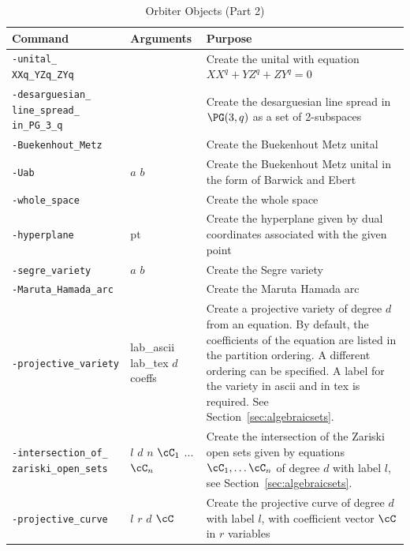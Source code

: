 \begin{table}
\begin{center}
\begin{tabular}{|p{4cm}|l|p{8cm}|}
\hline
Command  & Arguments & Purpose \\
\hline
\hline
\verb'-unital_' \verb'XXq_YZq_ZYq' &  &  Create  the unital with equation $XX^q+YZ^q+ZY^q=0$ \\
\hline
\verb'-desarguesian_' \verb'line_spread_' \verb'in_PG_3_q' &  & Create the desarguesian line spread in $\PG(3,q)$ as a set of 2-subspaces \\
\hline
\verb'-Buekenhout_Metz' &  & Create the Buekenhout Metz unital \\
\hline
\verb'-Uab' & $a$ $b$ & Create the Buekenhout Metz unital in the form of Barwick and Ebert~\cite{BarwickEbert2008}\\
\hline
\verb'-whole_space' &  & Create the whole space\\
\hline
\verb'-hyperplane' & pt & Create the hyperplane given by dual coordinates associated with the given point\\
\hline
\verb'-segre_variety' & $a$ $b$ & Create the Segre variety\\
\hline
\verb'-Maruta_Hamada_arc' &  & Create the Maruta Hamada arc\\
\hline
		\verb'-projective_variety' & lab\_ascii lab\_tex $d$ coeffs & 
		Create a projective variety of degree $d$ from an equation. 
		By default, the coefficients of the equation are listed in the partition ordering. 
		A different ordering can be specified. 
		A label for the variety in ascii and in tex is required. See Section~\ref{sec:algebraicsets}. \\
\hline
\verb'-intersection_of_' \verb'zariski_open_sets' & $l$ $d$ $n$ $\cC_1$ ... $\cC_n$ & Create the intersection of the Zariski open sets given by equations $\cC_1,\ldots\cC_n$ of degree $d$ with label $l$, see Section~\ref{sec:algebraicsets}. \\
\hline
\verb'-projective_curve' & $l$ $r$ $d$ $\cC$ & Create the projective curve of degree $d$ with label $l$, 
with coefficient vector $\cC$ in $r$ variables\\
\hline
\end{tabular}
\end{center}
\caption{\label{tab:objects2}Orbiter Objects (Part 2)}
\end{table}
